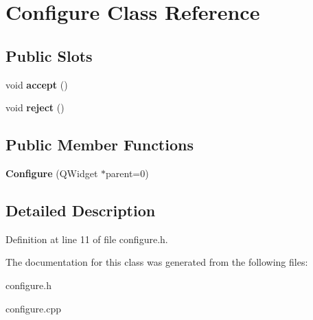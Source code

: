 \hypertarget{class_configure}{
\section{Configure Class Reference}
\label{class_configure}
}
\subsection*{Public Slots}
\begin{DoxyCompactItemize}
\item 
\hypertarget{class_configure_a66115fcdfd11a91ba7e2d087144c2bbe}{
void {\bfseries accept} ()}
\label{class_configure_a66115fcdfd11a91ba7e2d087144c2bbe}

\item 
\hypertarget{class_configure_aeaf3fcad117f9b4c547c730b395a7901}{
void {\bfseries reject} ()}
\label{class_configure_aeaf3fcad117f9b4c547c730b395a7901}

\end{DoxyCompactItemize}
\subsection*{Public Member Functions}
\begin{DoxyCompactItemize}
\item 
\hypertarget{class_configure_a1cd59a5ab072837723d492a0950179c7}{
{\bfseries Configure} (QWidget $\ast$parent=0)}
\label{class_configure_a1cd59a5ab072837723d492a0950179c7}

\end{DoxyCompactItemize}


\subsection{Detailed Description}


Definition at line 11 of file configure.h.



The documentation for this class was generated from the following files:\begin{DoxyCompactItemize}
\item 
configure.h\item 
configure.cpp\end{DoxyCompactItemize}
